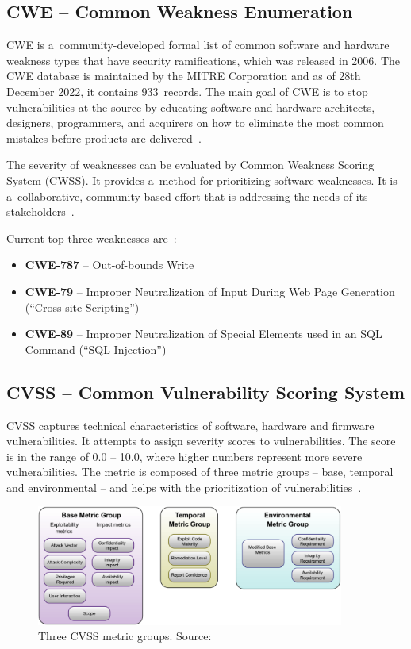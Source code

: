   \subsection*{CWE -- Common Weakness Enumeration}
    CWE is a~community-developed formal list of common software and hardware weakness types that
    have security ramifications, which was released in 2006. The CWE database is maintained by the MITRE Corporation
    and as of 28th December 2022, it contains 933~records. The main goal of CWE is to stop vulnerabilities
    at the source by educating software and hardware architects, designers, programmers, and acquirers
    on how to eliminate the most common mistakes before products are delivered~\cite{CWE}.

    The severity of weaknesses can be evaluated by Common Weakness Scoring System (CWSS). It provides a~method
    for prioritizing software weaknesses. It is a~collaborative, community-based effort that is addressing
    the needs of its stakeholders~\cite{CWSS}.

    \noindent Current top three weaknesses are~\cite{CWEtop25}:
    \begin{itemize}
      \item \textbf{CWE-787} -- Out-of-bounds Write
      \item \textbf{CWE-79} -- Improper Neutralization of Input During Web Page Generation (``Cross-site Scripting'')
      \item \textbf{CWE-89} -- Improper Neutralization of Special Elements used in an SQL Command (``SQL Injection'')
    \end{itemize}

  \subsection*{CVSS -- Common Vulnerability Scoring System}
  CVSS captures technical characteristics of software, hardware and firmware vulnerabilities. It attempts
  to assign severity scores to vulnerabilities. The score is in the range of 0.0 -- 10.0, where higher numbers represent
  more severe vulnerabilities. The metric is composed of three metric groups -- base, temporal and environmental --
  and helps with the prioritization of vulnerabilities~\cite{CVSSFirst, CVSSresearchgate}.

  \begin{figure}[h]
    \centering
    \includegraphics[width=0.9\textwidth]{obrazky-figures/cvss_metric_groups.png}
    \caption{Three CVSS metric groups. Source:~\cite{CVSSFirst}}
  \end{figure}

